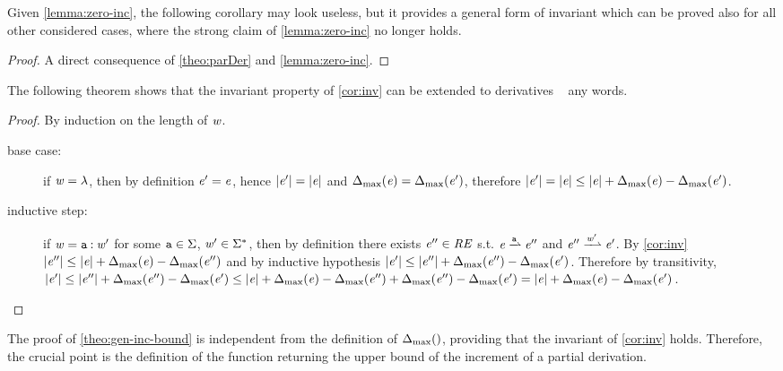 Given \cref{lemma:zero-inc}, the following corollary may look useless,
but it provides a general form of invariant which can be proved also for all other considered cases, where the strong claim of \cref{lemma:zero-inc} no longer holds.

\begin{proof}
 A direct consequence of \cref{theo:parDer} and \cref{lemma:zero-inc}.
\end{proof}

The following theorem shows that the invariant property of \cref{cor:inv} can be extended to derivatives \wrt~ any words.
\begin{proof}
 By induction on the length of $\mathit {w}$.
 \begin{description}
  \item[base case:] if $\mathit {w}=\lambda$, then by definition $\mathit {e}'=\mathit {e}$, hence
   ${\mid}{\mathit {e}'}{\mid}={\mid}{\mathit {e}}{\mid}$ and ${\Delta_{\max}}({\mathit {e}})={\Delta_{\max}}({\mathit {e}'})$, therefore ${\mid}{\mathit {e}'}{\mid}={\mid}{\mathit {e}}{\mid}\leq{\mid}{\ensuremath{\mathit {e}}}{\mid}+{\Delta_{\max}}({\mathit {e}})-{\Delta_{\max}}({\mathit {e}'})$.

  \item[inductive step:]
   if $\mathit {w}=\mathtt {a}\mathbin{:}\mathit {w}'$ for some $\mathtt {a}\in\Sigma$, $\mathit {w}'\in\Sigma^*$, then by definition there exists $\mathit {e}''\in\mathit {RE}$ s.t. $\re\parDer{\sym}\re''$ and $\re''\parDer{\word'}\re'$. By \cref{cor:inv} ${\mid}{\mathit {e}''}{\mid}\leq{\mid}{\ensuremath{\mathit {e}}}{\mid}+{\Delta_{\max}}({\mathit {e}})-{\Delta_{\max}}({\mathit {e}''})$ and by inductive hypothesis ${\mid}{\mathit {e}'}{\mid}\leq{\mid}{\ensuremath{\mathit {e}}''}{\mid}+{\Delta_{\max}}({\mathit {e}''})-{\Delta_{\max}}({\mathit {e}'})$. Therefore by transitivity,
   ${\mid}{\mathit {e}'}{\mid}\leq{\mid}{\ensuremath{\mathit {e}}''}{\mid}+{\Delta_{\max}}({\mathit {e}''})-{\Delta_{\max}}({\mathit {e}'})\leq{\mid}{\ensuremath{\mathit {e}}}{\mid}+{\Delta_{\max}}({\mathit {e}})-{\Delta_{\max}}({\mathit {e}''})+{\Delta_{\max}}({\mathit {e}''})-{\Delta_{\max}}({\mathit {e}'})={\mid}{\mathit {e}}{\mid}+{\Delta_{\max}}({\mathit {e}})-{\Delta_{\max}}({\mathit {e}'})$.
 \end{description}
\end{proof}

The proof of \cref{theo:gen-inc-bound} is independent from the definition of ${\Delta_{\max}}({})$, providing that the invariant of \cref{cor:inv} holds. Therefore, the crucial point  is the definition of the function returning the upper bound of the increment of a partial derivation.

